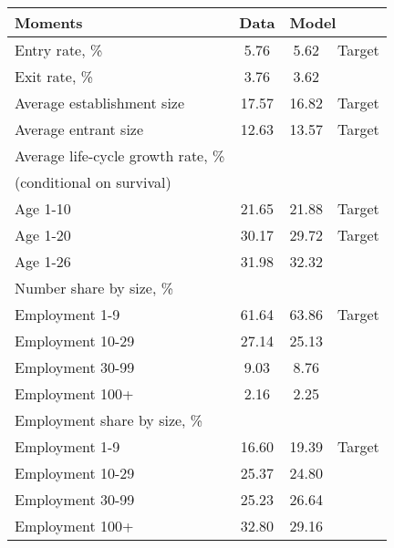 \begin{tabular}{lccc}
\toprule
                                 Moments &  Data & \multicolumn{2}{l}{Model} \\
\midrule
                          Entry rate, \% &  5.76 &  5.62 & Target \\
                           Exit rate, \% &  3.76 &  3.62 &        \\
              Average establishment size & 17.57 & 16.82 & Target \\
                    Average entrant size & 12.63 & 13.57 & Target \\
      Average life-cycle growth rate, \% &       &       &        \\
               (conditional on survival) &       &       &        \\
                   \hspace{10mm}Age 1-10 & 21.65 & 21.88 & Target \\
                   \hspace{10mm}Age 1-20 & 30.17 & 29.72 & Target \\
                   \hspace{10mm}Age 1-26 & 31.98 & 32.32 &        \\
                Number share by size, \% &       &       &        \\
             \hspace{10mm}Employment 1-9 & 61.64 & 63.86 & Target \\
           \hspace{10mm}Employment 10-29 & 27.14 & 25.13 &        \\
           \hspace{10mm}Employment 30-99 &  9.03 &  8.76 &        \\
            \hspace{10mm}Employment 100+ &  2.16 &  2.25 &        \\
            Employment share by size, \% &       &       &        \\
             \hspace{10mm}Employment 1-9 & 16.60 & 19.39 & Target \\
           \hspace{10mm}Employment 10-29 & 25.37 & 24.80 &        \\
           \hspace{10mm}Employment 30-99 & 25.23 & 26.64 &        \\
            \hspace{10mm}Employment 100+ & 32.80 & 29.16 &        \\

\end{tabular}
